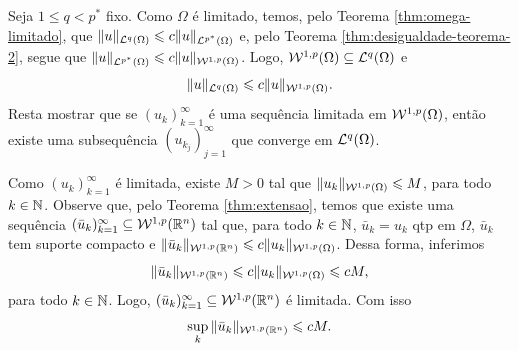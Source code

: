 \begin{prf}
    Seja $1 \leqslant q < p^*$ fixo.
    Como $\Omega$ é limitado, temos, pelo Teorema \ref{thm:omega-limitado}, que $\Vert u \Vert_{\mathcal{L}^q(\Omega)} \leqslant c \Vert u \Vert_{\mathcal{L}^{p^*}(\Omega)}$
    e, pelo Teorema \ref{thm:desigualdade-teorema-2}, segue que
    $\Vert u \Vert_{\mathcal{L}^{p^*}(\Omega)} \leqslant c \Vert u \Vert_{\mathcal{W}^{1,p}(\Omega)}$.
    Logo, $\mathcal{W}^{1,p}(\Omega) \subseteq \mathcal{L}^q(\Omega)$ e
    \[
        \Vert u \Vert_{\mathcal{L}^q(\Omega)} \leqslant c \Vert u \Vert_{\mathcal{W}^{1,p}(\Omega)}.
    \]
    Resta mostrar que se $(u_k)_{k=1}^\infty$ é uma sequência limitada em $\mathcal{W}^{1,p}(\Omega)$, então existe uma subsequência $(u_{k_j})_{j=1}^\infty$ que converge em $\mathcal{L}^q(\Omega)$.
    
    Como $(u_k)_{k=1}^\infty$ é limitada, existe $M > 0$ tal que $\Vert u_k \Vert_{\mathcal{W}^{1,p}(\Omega)} \leqslant M$, para todo $k \in \mathbb{N}$.
    Observe que, pelo Teorema \ref{thm:extensao}, temos que existe uma sequência $(\bar u_k)_{k=1}^\infty \subseteq \mathcal{W}^{1,p}(\mathbb{R}^n)$ tal que, para todo $k \in \mathbb{N}$, $\bar u_k = u_k$ qtp em $\Omega$, $\bar u_k$ tem suporte compacto e $\Vert \bar u_k \Vert_{\mathcal{W}^{1,p}(\mathbb{R}^n)} \leqslant c \Vert u_k \Vert_{\mathcal{W}^{1,p}(\Omega)}$.
    Dessa forma, inferimos
    \[
        \Vert \bar u_k \Vert_{\mathcal{W}^{1,p}(\mathbb{R}^n)} \leqslant c \Vert u_k \Vert_{\mathcal{W}^{1,p}(\Omega)} \leqslant cM,
    \]
    para todo $k \in \mathbb{N}$.
    Logo, $(\bar u_k)_{k=1}^\infty \subseteq \mathcal{W}^{1,p}(\mathbb{R}^n)$ é limitada.
    Com isso
    \begin{equation} \label{eq:supfinito}
        \sup_{k} \Vert \bar u_k \Vert_{\mathcal{W}^{1,p}(\mathbb{R}^n)} \leqslant cM.
    \end{equation}


\end{prf}
